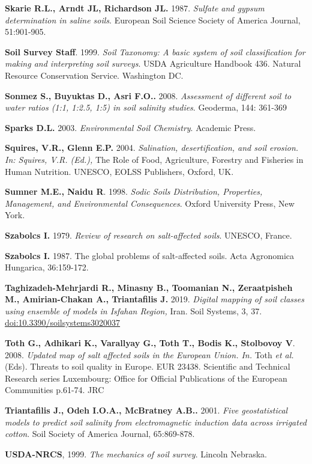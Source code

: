 \documentclass[
  10pt,
  b5paper,
]{book}
\begin{document}
\textbf{Skarie R.L., Arndt JL, Richardson JL.} 1987. \emph{Sulfate and gypsum determination in saline soils}. European Soil Science Society of America Journal, 51:901-905.

\textbf{Soil Survey Staff}. 1999. \emph{Soil Taxonomy: A basic system of soil classification for making and interpreting soil surveys}. USDA Agriculture Handbook 436. Natural Resource Conservation Service. Washington DC.

\textbf{Sonmez S., Buyuktas D., Asri F.O..} 2008. \emph{Assessment of different soil to water ratios (1:1, 1:2.5, 1:5) in soil salinity studies}. Geoderma, 144: 361-369

\textbf{Sparks D.L.} 2003. \emph{Environmental Soil Chemistry}. Academic Press.

\textbf{Squires, V.R., Glenn E.P.} 2004. \emph{Salination, desertification, and soil erosion. In: Squires, V.R. (Ed.),} The Role of Food, Agriculture, Forestry and Fisheries in Human Nutrition. UNESCO, EOLSS Publishers, Oxford, UK.

\textbf{Sumner M.E., Naidu R}. 1998. \emph{Sodic Soils Distribution, Properties, Management, and Environmental Consequences}. Oxford University Press, New York.

\textbf{Szabolcs I.} 1979. \emph{Review of research on salt-affected soils}. UNESCO, France.

\textbf{Szabolcs I.} 1987. The global problems of salt-affected soils. Acta Agronomica Hungarica, 36:159-172.

\textbf{Taghizadeh-Mehrjardi R., Minasny B., Toomanian N., Zeraatpisheh M., Amirian-Chakan A., Triantafilis J.} 2019. \emph{Digital mapping of soil classes using ensemble of models in Isfahan Region,} Iran. Soil Systems, 3, 37. \url{doi:10.3390/soilsystems3020037}

\textbf{Toth G., Adhikari K., Varallyay G., Toth T., Bodis K., Stolbovoy V}. 2008. \emph{Updated map of salt affected soils in the European Union. In.} Toth \emph{et al.} (Eds). Threats to soil quality in Europe. EUR 23438. Scientific and Technical Research series Luxembourg: Office for Official Publications of the European Communities p.61-74. JRC

\textbf{Triantafilis J., Odeh I.O.A., McBratney A.B..} 2001. \emph{Five geostatistical models to predict soil salinity from electromagnetic induction data across irrigated cotton}. Soil Society of America Journal, 65:869-878.

\textbf{USDA-NRCS}, 1999. \emph{The mechanics of soil survey}. Lincoln Nebraska.
\end{document}
